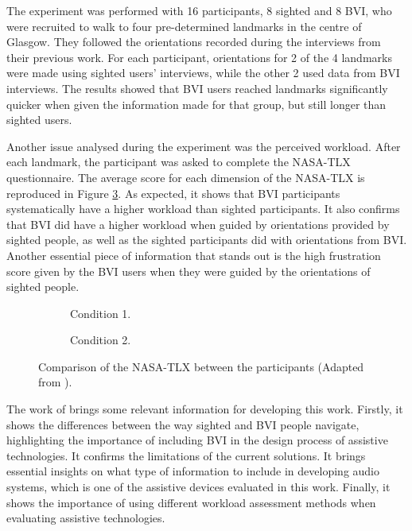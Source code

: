 The experiment was performed with 16 participants, 8 sighted and 8 BVI, who were recruited to walk to four pre-determined landmarks in the centre of Glasgow. They followed the orientations recorded during the interviews from their previous work. For each participant, orientations for 2 of the 4 landmarks were made using sighted users' interviews, while the other 2 used data from BVI interviews. The results showed that BVI users reached landmarks significantly quicker when given the information made for that group, but still longer than sighted users. 

Another issue analysed during the experiment was the perceived workload. After each landmark, the participant was asked to complete the NASA-TLX questionnaire. The average score for each dimension of the NASA-TLX is reproduced in Figure \ref{fig:bradley_2005_participants}. As expected, it shows that BVI participants systematically have a higher workload than sighted participants. It also confirms that BVI did have a higher workload when guided by orientations provided by sighted people, as well as the sighted participants did with orientations from BVI. Another essential piece of information that stands out is the high frustration score given by the BVI users when they were guided by the orientations of sighted people.

\begin{figure}[htbp]
    \centering
    \begin{subfigure}{.49\textwidth}
        \centering
        \resizebox{\linewidth}{!}{
        
        }
        \caption{Condition 1.}
        \label{fig:bradley_2005_nasa_participants_1}
    \end{subfigure}
    \hfill
    \begin{subfigure}{.49\textwidth}
        \centering
        \resizebox{\linewidth}{!}{
        
        }
        \caption{Condition 2.}
        \label{fig:bradley_2005_nasa_participants_2}
    \end{subfigure}
\caption{Comparison of the NASA-TLX between the participants (Adapted from ).}
\label{fig:bradley_2005_participants}
\end{figure}

The work of  brings some relevant information for developing this work. Firstly, it shows the differences between the way sighted and BVI people navigate, highlighting the importance of including BVI in the design process of assistive technologies. It confirms the limitations of the current solutions. It brings essential insights on what type of information to include in developing audio systems, which is one of the assistive devices evaluated in this work. Finally, it shows the importance of using different workload assessment methods when evaluating assistive technologies.